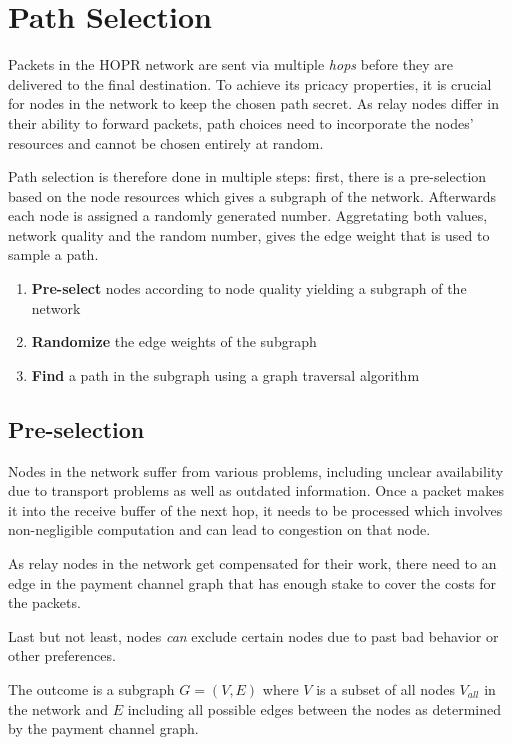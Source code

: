 \section{Path Selection}
\label{sec:path-selection}

Packets in the HOPR network are sent via multiple \textit{hops} before they are delivered to the final destination. To achieve its pricacy properties, it is crucial for nodes in the network to keep the chosen path secret. As relay nodes differ in their ability to forward packets, path choices need to incorporate the nodes' resources and cannot be chosen entirely at random.

Path selection is therefore done in multiple steps: first, there is a pre-selection based on the node resources which gives a subgraph of the network. Afterwards each node is assigned a randomly generated number. Aggretating both values, network quality and the random number, gives the edge weight that is used to sample a path.

\begin{enumerate}
    \item \textbf{Pre-select} nodes according to node quality yielding a subgraph of the network
    \item \textbf{Randomize} the edge weights of the subgraph
    \item \textbf{Find} a path in the subgraph using a graph traversal algorithm
\end{enumerate}

\subsection{Pre-selection}
\label{sec:pathselection:pre-selection}

Nodes in the network suffer from various problems, including unclear availability due to transport problems as well as outdated information. Once a packet makes it into the receive buffer of the next hop, it needs to be processed which involves non-negligible computation and can lead to congestion on that node.

As relay nodes in the network get compensated for their work, there need to an edge in the payment channel graph that has enough stake to cover the costs for the packets.

Last but not least, nodes \textit{can} exclude certain nodes due to past bad behavior or other preferences.

The outcome is a subgraph $G = (V, E)$ where $V$ is a subset of all nodes $V_{all}$ in the network and $E$ including all possible edges between the nodes as determined by the payment channel graph.

